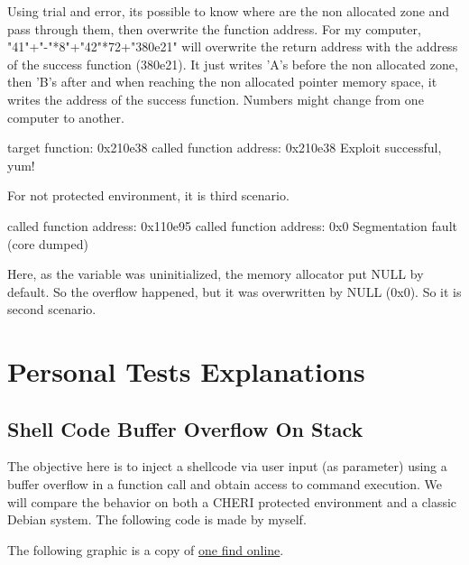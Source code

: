 \documentclass[a4paper, 11pt]{article}
\begin{document}
		Using trial and error, its possible to know where are the non allocated zone and pass through them, then overwrite the function address.
		For my computer, "41"+"-"*8"+"42"*72+"380e21" will overwrite the return address with the address of the success function (380e21).
		It just writes 'A's before the non allocated zone, then 'B's after and when reaching the non allocated pointer memory space, it writes the address of the success function.
		Numbers might change from one computer to another.
		\begin{tcolorbox}[colback=gray!5!white, colframe=gray!75!black, title=baseline RISC-V environment ]
			target function: 0x210e38
			called function address: 0x210e38
			Exploit successful, yum!
		\end{tcolorbox}
		For not protected environment, it is third scenario.
		\begin{tcolorbox}[colback=gray!5!white, colframe=blue!75!black, title=CHERI-RISC-V environment]
			called function address: 0x110e95
			called function address: 0x0
			Segmentation fault (core dumped)
		\end{tcolorbox}
		Here, as the variable was uninitialized, the memory allocator put NULL by default.
		So the overflow happened, but it was overwritten by NULL (0x0). So it is second scenario.
	
\section{Personal Tests Explanations}
\subsection{Shell Code Buffer Overflow On Stack}
The objective here is to inject a shellcode via user input (as parameter) using a buffer overflow in a function call and obtain access to command execution.
We will compare the behavior on both a CHERI protected environment and a classic Debian system.
The following code is made by myself.

The following graphic is a copy of \href{https://hg8.sh/posts/binary-exploitation/buffer-overflow-code-execution-by-shellcode-injection/}{one find online}.
\end{document}
